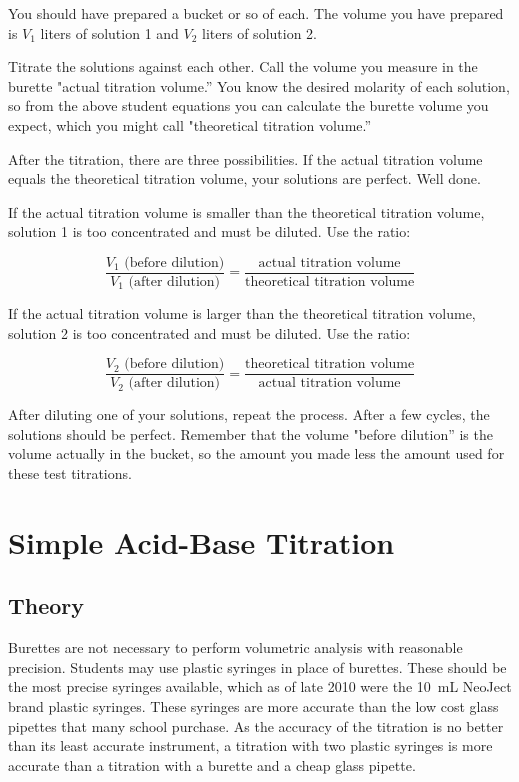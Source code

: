 You should have prepared a bucket or so of each. The volume you have prepared is $ V_{1} $ liters of solution 1 and $ V_{2} $ liters of solution 2.

Titrate the solutions against each other. Call the volume you measure in the burette "actual titration volume.''  You know the desired molarity of each solution, so from the above student equations you can calculate the burette volume you expect, which you might call "theoretical titration volume.''

After the titration, there are three possibilities. If the actual titration volume equals the theoretical titration volume, your solutions are perfect. Well done.

If the actual titration volume is smaller than the theoretical titration volume, solution 1 is too concentrated and must be diluted. Use the ratio:

\[ \frac{V_{1} \mbox{ (before dilution)}}{V_{1} \mbox{ (after dilution)}} = \frac{\mbox{actual titration volume}}{\mbox{theoretical titration volume}} \]

If the actual titration volume is larger than the theoretical titration volume, solution 2 is too concentrated and must be diluted. Use the ratio:

\[ \frac{V_{2} \mbox{ (before dilution)}}{V_{2} \mbox{ (after dilution)}} = \frac{\mbox{theoretical titration volume}}{\mbox{actual titration volume}} \]

After diluting one of your solutions, repeat the process. After a few cycles, the solutions should be perfect. Remember that the volume "before dilution'' is the volume actually in the bucket, so the amount you made less the amount used for these test titrations.

\section{Simple Acid-Base Titration}

\subsection{Theory}

Burettes are not necessary to perform volumetric analysis with reasonable precision. Students may use plastic syringes in place of burettes. These should be the most precise syringes available, which as of late 2010 were the 10~mL NeoJect brand plastic syringes. These syringes are more accurate than the low cost glass pipettes that many school purchase. As the accuracy of the titration is no better than its least accurate instrument, a titration with two plastic syringes is more accurate than a titration with a burette and a cheap glass pipette.

